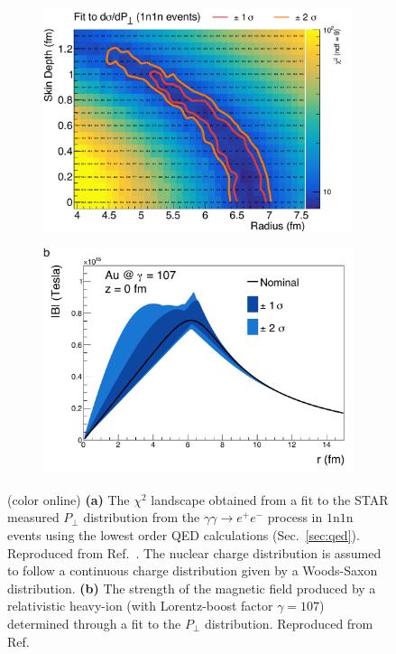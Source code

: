 \documentclass[twocolumn,epjc3]{svjour3}\sloppy
\begin{document}
\begin{figure}
  \centering
  \begin{subfigure}{.49\textwidth}
    \centering
    \includegraphics[width=0.99\textwidth]{fig/Fig_contour.pdf}
    \caption{}
  \end{subfigure}%
  \begin{subfigure}{.51\textwidth}
    \centering
    \includegraphics[width=.99\linewidth]{fig/bfield_au_smooth.pdf}
    \caption{}
  \end{subfigure}
  \caption{(color online) \textbf{(a)} The $\chi^2$ landscape obtained from a fit to the STAR measured $P_\perp$ distribution from the $\gamma\gamma \rightarrow e^+e^-$ process in $1$n$1$n events using the lowest order QED calculations (Sec.~\ref{sec:qed}). Reproduced from Ref.~\cite{starcollaborationMeasurementMomentumAngular2021}. The nuclear charge distribution is assumed to follow a continuous charge distribution given by a Woods-Saxon distribution. \textbf{(b)} The strength of the magnetic field produced by a relativistic heavy-ion (with Lorentz-boost factor $\gamma=107$) determined through a fit to the $P_\perp$ distribution. Reproduced from Ref.~\cite{starcollaborationMeasurementMomentumAngular2021} }
  \label{fig:b_mapping}
\end{figure}
\end{document}
